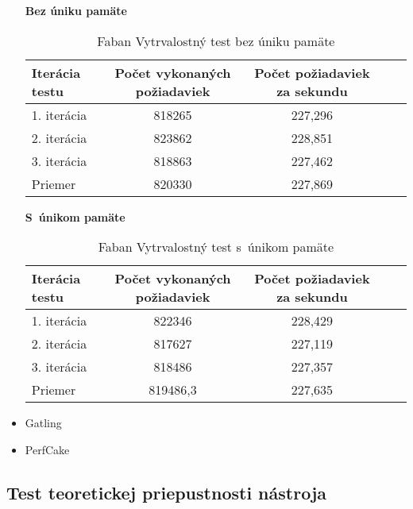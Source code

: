 \documentclass[12pt,oneside,final]{fithesis-utf8}
\begin{document}
\begin{itemize}
\textbf{Bez úniku pamäte}

\begin{table}[H]
\begin{center}
\begin{tabular}{ | l | c | c | c | c |}
		\hline
		 \textbf{Iterácia testu} & \textbf{Počet vykonaných požiadaviek} & \textbf{Počet požiadaviek za sekundu} \\ \hline
		 1. iterácia & 818265 & 227,296 \\ \hline
		 2. iterácia & 823862 & 228,851 \\ \hline
		 3. iterácia & 818863 & 227,462 \\ \hline
		 Priemer & 820330 & 227,869 \\ \hline
		 
\end{tabular}
\end{center}
\caption{Faban Vytrvalostný test bez úniku pamäte}
\end{table}



\textbf{S~únikom pamäte}

\begin{table}[H]
\begin{center}
\begin{tabular}{ | l | c | c | c | c |}
		\hline
		 \textbf{Iterácia testu} & \textbf{Počet vykonaných požiadaviek} & \textbf{Počet požiadaviek za sekundu} \\ \hline
		 1. iterácia & 822346 & 228,429 \\ \hline
		 2. iterácia & 817627 & 227,119 \\ \hline
		 3. iterácia & 818486 & 227,357 \\ \hline
		 Priemer & 819486,3 & 227,635 \\ \hline
		 
\end{tabular}
\end{center}
\caption{Faban Vytrvalostný test s~únikom pamäte}
\end{table}


\item Gatling

\item PerfCake

\end{itemize}

\subsection{Test teoretickej priepustnosti nástroja}
\end{document}

